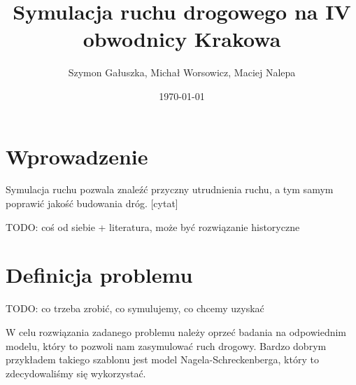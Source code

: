 \documentclass[a4paper,12pt]{article}
\title{Symulacja ruchu drogowego na IV obwodnicy Krakowa}
\author{Szymon Gałuszka, Michał Worsowicz, Maciej Nalepa}
\date{\today}
\begin{document}
	\maketitle
	
	\section{Wprowadzenie}
	Symulacja ruchu pozwala znaleźć przyczny utrudnienia ruchu, a tym samym poprawić jakość budowania dróg. [cytat]
	
	TODO: coś od siebie + literatura, może być rozwiązanie historyczne
	
	\section{Definicja problemu}
	TODO: co trzeba zrobić, co symulujemy, co chcemy uzyskać
	
	W celu rozwiązania zadanego problemu należy oprzeć badania na odpowiednim modelu, który to pozwoli nam zasymulować ruch drogowy. Bardzo dobrym przykładem takiego szablonu jest model Nagela-Schreckenberga, który to zdecydowaliśmy się wykorzystać.
	
\end{document}
